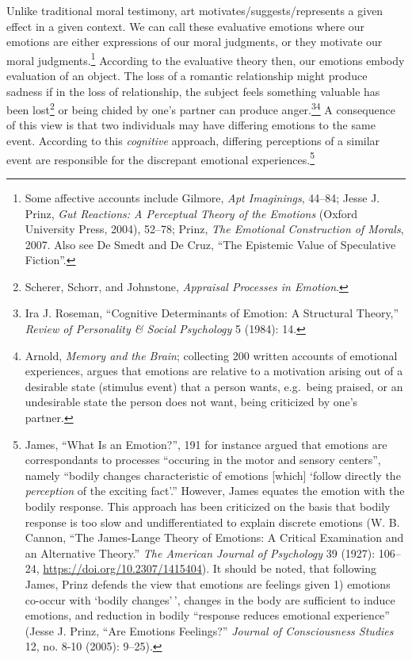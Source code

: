 \documentclass[phdthesis,12pt,final,a4paper]{wuthesis}
\theoremstyle{definition}
\theoremstyle{definition}
\theoremstyle{definition}
\theoremstyle{definition}
\theoremstyle{remark}
\begin{document}
Unlike traditional moral testimony, art motivates/suggests/represents a given effect in a given context. We can call these evaluative emotions where our emotions are either expressions of our moral judgments, or they motivate our moral judgments.\footnote{Some affective accounts include Gilmore, \emph{Apt {Imaginings}}, 44--84; Jesse J. Prinz, \emph{Gut {Reactions}: {A Perceptual Theory} of the {Emotions}} (Oxford University Press, 2004), 52--78; Prinz, \emph{The {Emotional Construction} of {Morals}}, 2007. Also see De Smedt and De Cruz, {``The Epistemic Value of Speculative Fiction''}.} According to the evaluative theory then, our emotions embody evaluation of an object. The loss of a romantic relationship might produce sadness if in the loss of relationship, the subject feels something valuable has been lost\footnote{Scherer, Schorr, and Johnstone, \emph{Appraisal Processes in Emotion}.} or being chided by one's partner can produce anger.\footnote{Ira J. Roseman, {``Cognitive Determinants of Emotion: {A} Structural Theory,''} \emph{Review of Personality \& Social Psychology} 5 (1984): 14.}\footnote{Arnold, \emph{Memory and the Brain}; collecting 200 written accounts of emotional experiences, argues that emotions are relative to a motivation arising out of a desirable state (stimulus event) that a person wants, e.g.~being praised, or an undesirable state the person does not want, being criticized by one's partner.} A consequence of this view is that two individuals may have differing emotions to the same event. According to this \emph{cognitive} approach, differing perceptions of a similar event are responsible for the discrepant emotional experiences.\footnote{James, {``What Is an Emotion?''}, 191 for instance argued that emotions are correspondants to processes ``occuring in the motor and sensory centers'', namely ``bodily changes characteristic of emotions {[}which{]} `follow directly the \emph{perception} of the exciting fact'.'' However, James equates the emotion with the bodily response. This approach has been criticized on the basis that bodily response is too slow and undifferentiated to explain discrete emotions (W. B. Cannon, {``The {James-Lange} Theory of Emotions: A Critical Examination and an Alternative Theory.''} \emph{The American Journal of Psychology} 39 (1927): 106--24, \url{https://doi.org/10.2307/1415404}). It should be noted, that following James, Prinz defends the view that emotions are feelings given 1) emotions co-occur with `bodily changes'\,', changes in the body are sufficient to induce emotions, and reduction in bodily ``response reduces emotional experience'' (Jesse J. Prinz, {``Are Emotions Feelings?''} \emph{Journal of Consciousness Studies} 12, no. 8-10 (2005): 9--25).}
\end{document}
